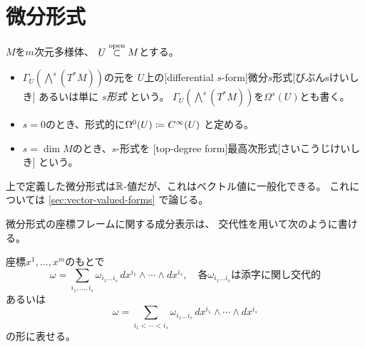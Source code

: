 \documentclass[report]{jlreq}
\begin{document}
%
\section{微分形式}

\begin{definition}[微分形式]
    $M$を$m$次元多様体、
    $U \stackrel{\text{open}}{\subset} M$とする。
    \begin{itemize}
        \item $\Gamma_U(\bigwedge^s(T^*M))$の元を
            $U$上の[differential $s$-form]{微分$s$形式}[びぶんsけいしき]
            あるいは単に
            \emph{$s$形式}
            という。
            $\Gamma_U(\bigwedge^s(T^*M))$を$\Omega^s(U)$とも書く。
        \item $s = 0$のとき、形式的に$\Omega^0(U) \coloneqq C^\infty(U)$
            と定める。
        \item $s = \dim M$のとき、$s$-形式を
            [top-degree form]{最高次形式}[さいこうじけいしき]
            という。
    \end{itemize}
\end{definition}

\begin{remark}
    上で定義した微分形式は$\mathbb{R}$-値だが、これはベクトル値に一般化できる。
    これについては \cref{sec:vector-valued-forms} で論じる。
\end{remark}

微分形式の座標フレームに関する成分表示は、
交代性を用いて次のように書ける。

\begin{proposition}[微分形式の座標フレームに関する成分表示]
    座標$x^1, \dots, x^m$のもとで
    \begin{equation}
        \omega = \sum_{i_1, \dots, i_s}
            \omega_{i_1 \dots i_s} \,
            dx^{i_1} \wedge \cdots \wedge dx^{i_s},
            \quad
            \text{各$\omega_{i_1 \dots i_s}$は添字に関し交代的}
    \end{equation}
    あるいは
    \begin{equation}
        \omega = \sum_{i_1 < \cdots < i_s}
            \omega_{i_1 \dots i_s} \,
            dx^{i_1} \wedge \cdots \wedge dx^{i_s}
    \end{equation}
    の形に表せる。
    \TODO{}
\end{proposition}
\end{document}
